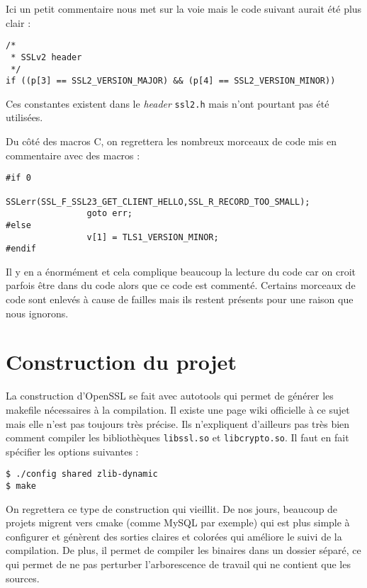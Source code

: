 Ici un petit commentaire nous met sur la voie mais le code suivant aurait été plus clair :
\begin{lstlisting}[style=customc,label=badcodetestfixed, caption=Exemple de mauvais test d'OpenSSL corrigé]
/*
 * SSLv2 header
 */
if ((p[3] == SSL2_VERSION_MAJOR) && (p[4] == SSL2_VERSION_MINOR))
\end{lstlisting}

Ces constantes existent dans le \textit{header} \verb+ssl2.h+ mais n'ont pourtant pas été utilisées.

Du côté des macros C, on regrettera les nombreux morceaux de code mis en commentaire avec des  macros :

\begin{lstlisting}[style=customc,label=badcodeif0, caption=Exemple de mauvais \#if 0 d'OpenSSL]
#if 0
				SSLerr(SSL_F_SSL23_GET_CLIENT_HELLO,SSL_R_RECORD_TOO_SMALL);
				goto err;
#else
				v[1] = TLS1_VERSION_MINOR;
#endif
\end{lstlisting}

Il y en a énormément et cela complique beaucoup la lecture du code car on croit parfois être dans du code alors que ce code est commenté. Certains morceaux de code sont enlevés à cause de failles mais ils restent présents pour une raison que nous ignorons.


\section{Construction du projet}
La construction d'OpenSSL se fait avec autotools qui permet de générer les makefile nécessaires à la compilation. Il existe une page wiki officielle à ce sujet mais elle n'est pas toujours très précise. Ils n'expliquent d'ailleurs pas très bien comment compiler les bibliothèques \verb+libssl.so+ et \verb+libcrypto.so+. Il faut en fait spécifier les options suivantes :
\begin{verbatim}
$ ./config shared zlib-dynamic
$ make
\end{verbatim}

On regrettera ce type de construction qui vieillit. De nos jours, beaucoup de projets migrent vers cmake (comme MySQL par exemple) qui est plus simple à configurer et génèrent des sorties claires et colorées qui améliore le suivi de la compilation. De plus, il permet de compiler les binaires dans un dossier séparé, ce qui permet de ne pas perturber l'arborescence de travail qui ne contient que les sources.


